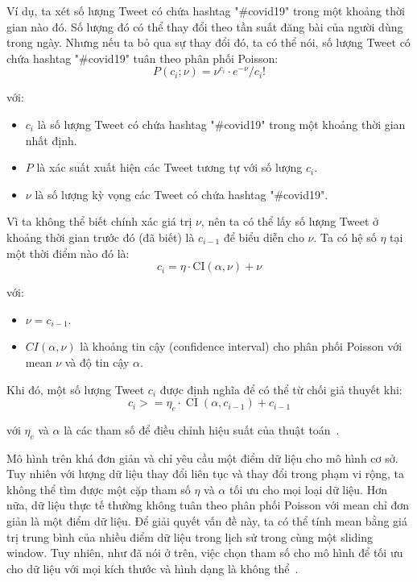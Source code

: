 Ví dụ, ta xét số lượng Tweet có chứa hashtag "\#covid19" trong một khoảng thời
gian nào đó. Số lượng đó có thể thay đổi theo tần suất đăng bài của người dùng
trong ngày.  Nhưng nếu ta bỏ qua sự thay đổi đó, ta có thể nói, số lượng Tweet
có chứa hashtag "\#covid19" tuân theo phân phối Poisson:
\[ P\left(c_{i} ; \nu\right)=\nu^{c_{i}} \cdot e^{-\nu} / c_{i} ! \]

với:
\begin{itemize}
	\item $c_{i}$ là số lượng Tweet có chứa hashtag "\#covid19" trong một khoảng
	thời gian nhất định.
	\item $P$ là xác suất xuất hiện các Tweet tương tự với số lượng $c_{i}$.
	\item $\nu$ là số lượng kỳ vọng các Tweet có chứa hashtag "\#covid19".
\end{itemize}

Vì ta không thể biết chính xác giá trị $\nu$, nên ta có thể lấy số lượng Tweet ở
khoảng thời gian trước đó (đã biết) là $c_{i - 1}$ để biểu diễn cho $\nu$. Ta có
hệ số $\eta$ tại một thời điểm nào đó là:
\[ c_{i}=\eta \cdot \mathrm{CI}(\alpha, \nu)+\nu \]

với:
\begin{itemize}
	\item $\nu=c_{i-1}$.
	\item $CI(\alpha, \nu)$ là khoảng tin cậy (confidence interval) cho phân
	phối Poisson với mean $\nu$ và độ tin cậy $\alpha$.
\end{itemize}

Khi đó, một số lượng Tweet $c_{i}$ được định nghĩa để có thể từ chối giả thuyết
khi:
\[
	c_{i}>=\eta_{c} \cdot \operatorname{CI}\left(\alpha, c_{i-1}\right)+c_{i-1}
\]

với $\eta_{c}$ và $\alpha$ là các tham số để điều chỉnh hiệu suất của thuật
toán~\cite{hendricksonTrendDetectionSocial2015}.

Mô hình trên khá đơn giản và chỉ yêu cầu một điểm dữ liệu cho mô hình cơ sở.
Tuy nhiên với lượng dữ liệu thay đổi liên tục và thay đổi trong phạm vi rộng,
ta không thể tìm được một cặp tham số $\eta$ và $\alpha$ tối ưu cho mọi loại dữ
liệu. Hơn nữa, dữ liệu thực tế thường không tuân theo phân phối Poisson với
mean chỉ đơn giản là một điểm dữ liệu. Để giải quyết vấn đề này, ta có thể tính
mean bằng giá trị trung bình của nhiều điểm dữ liệu trong lịch sử trong cùng
một sliding window. Tuy nhiên, như đã nói ở trên, việc chọn tham số cho mô hình
để tối ưu cho dữ liệu với mọi kích thước và hình dạng là không
thể~\cite{hendricksonTrendDetectionSocial2015}.

